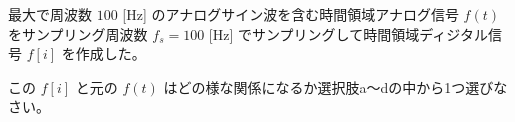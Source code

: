 最大で周波数 $100$ [Hz] のアナログサイン波を含む時間領域アナログ信号 $f(t)$ をサンプリング周波数 $f_s = 100$ [Hz] でサンプリングして時間領域ディジタル信号 $f[i]$ を作成した。\par
この $f[i]$ と元の $f(t)$ はどの様な関係になるか選択肢a〜dの中から1つ選びなさい。
